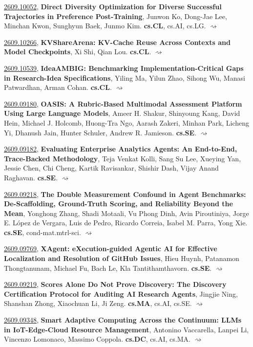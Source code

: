 \documentclass[9pt, a4paper]{article}
\theoremstyle{plain}
\theoremstyle{definition}
\theoremstyle{remark}
\newcommand{\arxiv}[3]{\href{https://arxiv.org/abs/#1}{#1}, \textbf{\textcolor{arxivblue}{#2}}, #3. }
\begin{document}
\arxiv{2609.10052}{Direct Diversity Optimization for Diverse Successful Trajectories in Preference Post-Training}{Junwon Ko, Dong-Jae Lee, Minchan Kwon, Sunghyun Baek, Junmo Kim}\textbf{cs.CL}, cs.AI, cs.LG. \hyperlink{2609.10052}{$\rightsquigarrow$}

\arxiv{2609.10266}{KVShareArena: KV-Cache Reuse Across Contexts and Model Checkpoints}{Xi Shi, Qian Lou}\textbf{cs.CL}. \hyperlink{2609.10266}{$\rightsquigarrow$}

\arxiv{2609.10539}{IdeaAMBIG: Benchmarking Implementation-Critical Gaps in Research-Idea Specifications}{Yiling Ma, Yilun Zhao, Sihong Wu, Manasi Patwardhan, Arman Cohan}\textbf{cs.CL}. \hyperlink{2609.10539}{$\rightsquigarrow$}

\arxiv{2609.09180}{OASIS: A Rubric-Based Multimodal Assessment Platform Using Large Language Models}{Ameer H. Shakur, Shinyoung Kang, David Hein, Michael J. Holcomb, Huong-Tra Ngo, Aarash Zakeri, Minhan Park, Licheng Yi, Dhanush Jain, Hunter Schuler, Andrew R. Jamieson}\textbf{cs.SE}. \hyperlink{2609.09180}{$\rightsquigarrow$}

\arxiv{2609.09182}{Evaluating Enterprise Analytics Agents: An End-to-End, Trace-Backed Methodology}{Teja Venkat Kolli, Sang Su Lee, Xueying Yan, Jessie Chen, Chi Cheng, Kartik Ravisankar, Shishir Dash, Vijay Anand Raghavan}\textbf{cs.SE}. \hyperlink{2609.09182}{$\rightsquigarrow$}

\arxiv{2609.09218}{The Double Measurement Confound in Agent Benchmarks: De-Scaffolding, Ground-Truth Scoring, and Reliability Beyond the Mean}{Yonghong Zhang, Shadi Motaali, Vu Phong Dinh, Avin Piroutiniya, Jorge E. López de Vergara, Luis de Pedro, Ricardo Correia, Isabel M. Parra, Yong Xie}\textbf{cs.SE}, cond-mat.mtrl-sci. \hyperlink{2609.09218}{$\rightsquigarrow$}

\arxiv{2609.09769}{XAgent: eXecution-guided Agentic AI for Effective Localization and Resolution of GitHub Issues}{Hieu Huynh, Patanamon Thongtanunam, Michael Fu, Bach Le, Kla Tantithamthavorn}\textbf{cs.SE}. \hyperlink{2609.09769}{$\rightsquigarrow$}

\arxiv{2609.09219}{Scores Alone Do Not Prove Discovery: The Discovery Certification Protocol for Auditing AI Research Agents}{Jingjie Ning, Shanshan Zhong, Xiaochuan Li, Ji Zeng}\textbf{cs.MA}, cs.AI, cs.SE. \hyperlink{2609.09219}{$\rightsquigarrow$}

\arxiv{2609.09348}{Smart Adaptive Computing Across the Continuum: LLMs in IoT-Edge-Cloud Resource Management}{Antonino Vaccarella, Lanpei Li, Vincenzo Lomonaco, Massimo Coppola}\textbf{cs.DC}, cs.AI, cs.MA. \hyperlink{2609.09348}{$\rightsquigarrow$}
\end{document}
